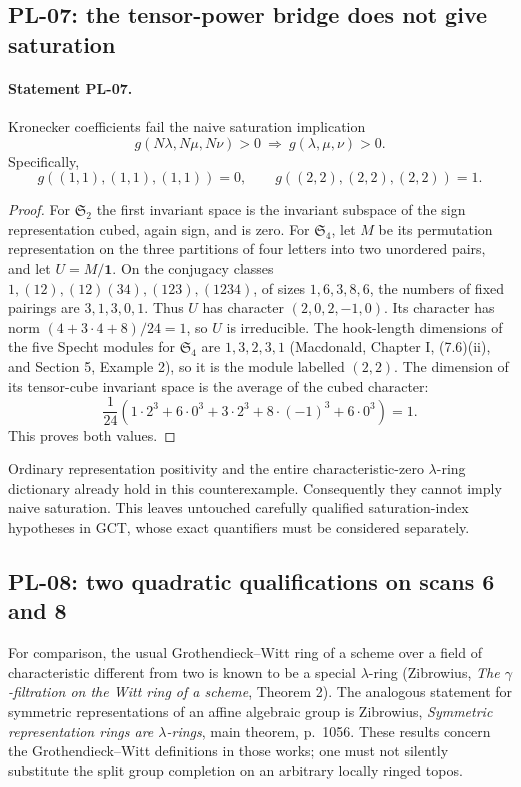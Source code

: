 \documentclass[11pt,a4paper]{article}
\begin{document}
\subsection{PL-07: the tensor-power bridge does not give saturation}
\paragraph{Statement PL-07.}
Kronecker coefficients fail the naive saturation implication
\[
 g(N\lambda,N\mu,N\nu)>0\ \Longrightarrow\ g(\lambda,\mu,\nu)>0.
\]
Specifically,
\[
 g((1,1),(1,1),(1,1))=0,\qquad
 g((2,2),(2,2),(2,2))=1.
\]

\begin{proof}
For $\mathfrak S_2$ the first invariant space is the invariant subspace of
the sign representation cubed, again sign, and is zero.
For $\mathfrak S_4$, let $M$ be its permutation representation on the
three partitions of four letters into two unordered pairs, and let
$U=M/\mathbf1$. On the conjugacy classes
$1,(12),(12)(34),(123),(1234)$, of sizes $1,6,3,8,6$, the numbers of
fixed pairings are $3,1,3,0,1$. Thus $U$ has character
$(2,0,2,-1,0)$. Its character has norm
$(4+3\cdot4+8)/24=1$, so $U$ is irreducible. The hook-length dimensions
of the five Specht modules for $\mathfrak S_4$ are $1,3,2,3,1$
(Macdonald, Chapter I, (7.6)(ii), and Section 5, Example 2), so it is
the module labelled $(2,2)$. The dimension of its tensor-cube invariant
space is the average of the cubed character:
\[
 \frac{1}{24}(1\cdot2^3+6\cdot0^3+3\cdot2^3+8\cdot(-1)^3+6\cdot0^3)
 =1.
\]
This proves both values.
\end{proof}

Ordinary representation positivity and the entire characteristic-zero
$\lambda$-ring dictionary already hold in this counterexample. Consequently
they cannot imply naive saturation. This leaves untouched carefully
qualified saturation-index hypotheses in GCT, whose exact quantifiers must
be considered separately.

\subsection{PL-08: two quadratic qualifications on scans 6 and 8}
For comparison, the usual Grothendieck--Witt ring of a scheme over a field
of characteristic different from two is known to be a special
$\lambda$-ring (Zibrowius, \emph{The $\gamma$-filtration on the Witt ring of
a scheme}, Theorem 2). The analogous statement for symmetric representations
of an affine algebraic group is Zibrowius, \emph{Symmetric representation
rings are $\lambda$-rings}, main theorem, p.~1056. These results concern
the Grothendieck--Witt definitions in those works; one must not silently
substitute the split group completion on an arbitrary locally ringed topos.
\end{document}
